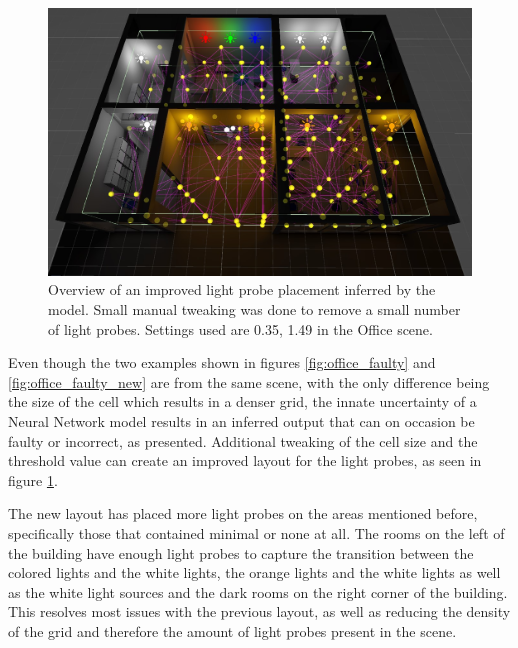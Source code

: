 \begin{figure}[h]
	\centering
	\includegraphics[width=\linewidth]{Graphics/results/office_0.35_1.49.jpg}
	\caption{Overview of an improved light probe placement inferred by the model. Small manual tweaking was done to remove a small number of light probes. Settings used are 0.35, 1.49 in the Office scene.}
	\label{fig:office_faulty_better}
\end{figure}

Even though the two examples shown in figures \ref{fig:office_faulty} and \ref{fig:office_faulty_new} are from the same scene, with the only difference being the size of the cell which results in a denser grid, the innate uncertainty of a Neural Network model results in an inferred output that can on occasion be faulty or incorrect, as presented. Additional tweaking of the cell size and the threshold value can create an improved layout for the light probes, as seen in figure \ref{fig:office_faulty_better}. 

The new layout has placed more light probes on the areas mentioned before, specifically those that contained minimal or none at all. The rooms on the left of the building have enough light probes to capture the transition between the colored lights and the white lights, the orange lights and the white lights as well as the white light sources and the dark rooms on the right corner of the building. This resolves most issues with the previous layout, as well as reducing the density of the grid and therefore the amount of light probes present in the scene.

